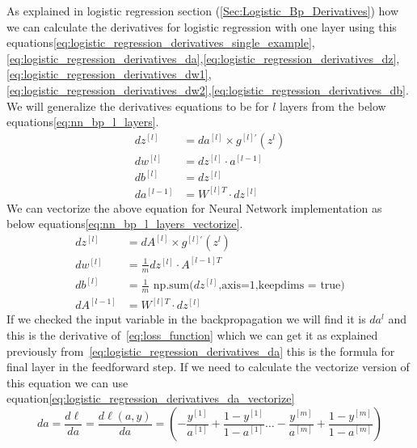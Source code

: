 As explained in logistic regression section (\ref{Sec:Logistic_Bp_Derivatives}) how we can calculate the derivatives for logistic regression with one layer using this equations\eqref{eq:logistic_regression_derivatives_single_example},\eqref{eq:logistic_regression_derivatives_da},\eqref{eq:logistic_regression_derivatives_dz},\\
\eqref{eq:logistic_regression_derivatives_dw1},\eqref{eq:logistic_regression_derivatives_dw2},\eqref{eq:logistic_regression_derivatives_db}.\\
We will generalize the derivatives equations to be for $l$ layers from the below equations\eqref{eq:nn_bp_l_layers}.%
 \begin{subequations}\label{eq:nn_bp_l_layers}
   \begin{align}
     dz^{[l]} & = da^{[l]} \times g^{[l]'}(z^{l}) \\
     dw^{[l]} & = dz^{[l]} \cdot a^{[l-1]} \\
     db^{[l]} & = dz^{[l]} \\
     da^{[l-1]} & = W^{[l]T} \cdot dz^{[l]} %
 \end{align}
\end{subequations}%
We can vectorize the above equation for Neural Network implementation as below equations\eqref{eq:nn_bp_l_layers_vectorize}.%
 \begin{subequations}\label{eq:nn_bp_l_layers_vectorize}
   \begin{align}
     dz^{[l]} & = dA^{[l]} \times g^{[l]'}(z^{l}) \\
     dw^{[l]} & = \frac{1}{m} dz^{[l]} \cdot A^{[l-1]T} \\
     db^{[l]} & = \frac{1}{m} \text{ np.sum(}dz^{[l]}\text{,axis=1,keepdims = true)} \\
     dA^{[l-1]} & = W^{[l]T} \cdot dz^{[l]} %
 \end{align}
\end{subequations}%
If we checked the input variable in the backpropagation we will find it is $da^{l}$ and this is the derivative of~\eqref{eq:loss_function} which we can get it as explained previously from~\eqref{eq:logistic_regression_derivatives_da} this is the formula for final layer in the feedforward step. If we need to calculate the vectorize version of this equation we can use equation\eqref{eq:logistic_regression_derivatives_da_vectorize}%
 \begin{equation}\label{eq:logistic_regression_derivatives_da_vectorize}
      da =  \frac{d\ell}{da} = \frac{d\ell(a,y)}{da} = (- \frac{y^{[1]}}{a^{[1]}} + \frac{1-y^{[1]}}{1-a^{[1]}} \ldots - \frac{y^{[m]}}{a^{[m]}} + \frac{1-y^{[m]}}{1-a^{[m]}} )
  \end{equation}%
